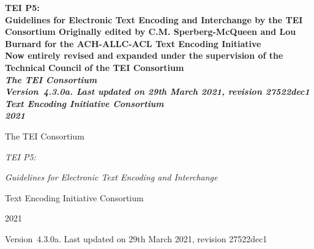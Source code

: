 
  \begin{titlepage}
\begin{center}
\vfill
\fontsize{36pt}{46pt}\bfseries\selectfont
TEI P5:\\
Guidelines for Electronic Text Encoding and Interchange
\vskip 1in
\fontsize{30pt}{40pt}\mdseries\selectfont
by the TEI Consortium
\vfill
\fontsize{20pt}{24pt}\selectfont
Originally edited by C.M. Sperberg-McQueen and Lou Burnard for the ACH-ALLC-ACL Text Encoding Initiative\\
Now entirely revised and expanded under the supervision of the Technical Council of the TEI Consortium\\

\vskip 0.5in\itshape
  The TEI Consortium\\
  Version 4.3.0a. Last updated on 29th March 2021, revision 27522dec1
  \vskip 1in\upshape
  Text Encoding Initiative Consortium \\
  2021
\end{center}

\begin{docAuthor} The TEI Consortium\end{docAuthor} \begin{docTitle}  \begin{titlePart} \textit{TEI P5:}\end{titlePart} \begin{titlePart} \textit{Guidelines for Electronic Text Encoding and Interchange}\end{titlePart} \end{docTitle} \begin{docImprint} Text Encoding Initiative Consortium \end{docImprint} \begin{docDate} 2021\end{docDate}
  \bgroup
  \fontsize{16pt}{14pt}\selectfont
  \maketitle
  \egroup
  \newpage
  \mbox{}\vskip4in
  \bgroup
  \fontsize{14pt}{16pt}\selectfont
  \begin{center}

  Version 4.3.0a. Last updated on 29th March 2021, revision 27522dec1
  \end{center}


\end{titlepage}
